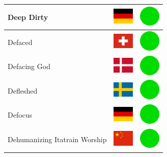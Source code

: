 \documentclass[12pt, a4paper, twoside]{report}
\begin{document}
\begin{center}
\begin{longtable}{|p{5cm}|p{2cm}|p{2cm}|}
 Deep Dirty                                                 & \includegraphics[width=1cm]{../img/flags/de} &   \includegraphics[width=1cm]{../likes/y} \\ \hline
 Defaced                                                    & \includegraphics[width=1cm]{../img/flags/ch} &   \includegraphics[width=1cm]{../likes/y} \\ \hline
 Defacing God                                               & \includegraphics[width=1cm]{../img/flags/dk} &   \includegraphics[width=1cm]{../likes/y} \\ \hline
 Defleshed                                                  & \includegraphics[width=1cm]{../img/flags/se} &   \includegraphics[width=1cm]{../likes/y} \\ \hline
 Defocus                                                    & \includegraphics[width=1cm]{../img/flags/de} &   \includegraphics[width=1cm]{../likes/y} \\ \hline
 Dehumanizing Itatrain Worship                              & \includegraphics[width=1cm]{../img/flags/cn} &   \includegraphics[width=1cm]{../likes/y} \\ \hline

\end{longtable}
\end{center}
\end{document}
